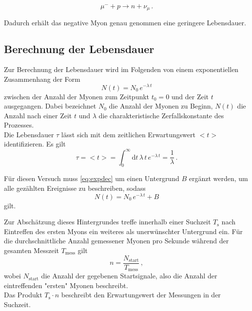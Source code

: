 \begin{equation*}
    \mu^- + p \rightarrow n + \nu_\mu \,.
\end{equation*}

Dadurch erhält das negative Myon genau genommen eine geringere Lebensdauer.


\subsection{Berechnung der Lebensdauer}

Zur Berechnung der Lebensdauer wird im Folgenden von einem exponentiellen Zusammenhang der Form
\begin{equation}
    N(t) = N_0 \, e^{-\lambda \, t}
    \label{eq:expdec}
\end{equation}
zwischen der Anzahl der Myonen zum Zeitpunkt $t_0 = 0$ und der Zeit $t$ ausgegangen. 
Dabei bezeichnet $N_0$ die Anzahl der Myonen zu Beginn, $N(t)$ die Anzahl nach einer Zeit $t$ und $\lambda$ die charakteristische Zerfallskonstante des Prozesses. \\

Die Lebensdauer $\tau$ lässt sich mit dem zeitlichen Erwartungswert $<t>$ identifizieren.
Es gilt
\begin{equation}
    \tau = <t> = \int_0^\infty \text{d} t \, \lambda \, t \, e^{-\lambda \, t} = \frac{1}{\lambda} \,.
\end{equation} 

Für diesen Versuch muss \eqref{eq:expdec} um einen Untergrund $B$ ergänzt werden, um alle gezählten Ereignisse zu beschreiben, sodass
\begin{equation}
    N(t) = N_0 \, e^{-\lambda \, t} + B
    \label{eq:exponential_decay}
\end{equation}
gilt.

Zur Abschätzung dieses Hintergrundes treffe innerhalb einer Suchzeit $T_\text{s}$ nach Eintreffen des ersten Myons ein weiteres als unerwünschter Untergrund ein.
Für die durchschnittliche Anzahl gemessener Myonen pro Sekunde während der gesamten Messzeit $T_\text{mess}$ gilt
\begin{equation*}
    n = \frac{N_\text{start}}{T_\text{mess}} \,,
\end{equation*}
wobei $N_\text{start}$ die Anzahl der gegebenen Startsignale, also die Anzahl der eintreffenden "ersten" Myonen beschreibt. \\

Das Produkt $T_\text{s} \cdot n$ beschreibt den Erwartungswert der Messungen in der Suchzeit. \\

